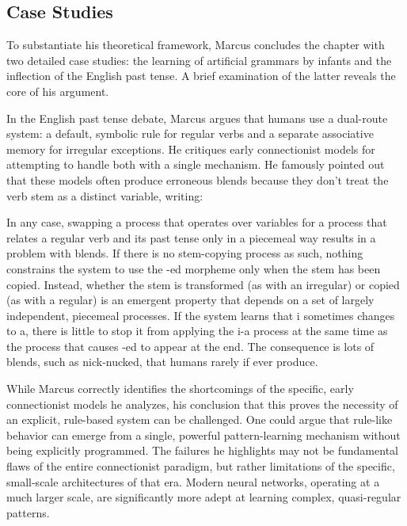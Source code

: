 \documentclass[../../main.tex]{subfiles}
\begin{document}

\subsection{Case Studies}
To substantiate his theoretical framework, Marcus concludes the chapter with two detailed case studies: the learning of artificial grammars by infants and the inflection of the English past tense. A brief examination of the latter reveals the core of his argument.

In the English past tense debate, Marcus argues that humans use a dual-route system: a default, symbolic rule for regular verbs and a separate associative memory for irregular exceptions. He critiques early connectionist models for attempting to handle both with a single mechanism. He famously pointed out that these models often produce erroneous blends because they don't treat the verb stem as a distinct variable, writing:

\begin{citecallout}
    In any case, swapping a process that operates over variables for a process that relates a regular verb and its past tense only in a piecemeal way
    results in a problem with blends. If there is no stem-copying process as
    such, nothing constrains the system to use the -ed morpheme only when
    the stem has been copied. Instead, whether the stem is transformed (as
    with an irregular) or copied (as with a regular) is an emergent property
    that depends on a set of largely independent, piecemeal processes. If the
    system learns that i sometimes changes to a, there is little to stop it from
    applying the i-a process at the same time as the process that causes -ed to
    appear at the end. The consequence is lots of blends, such as nick-nucked,
    that humans rarely if ever produce.
\end{citecallout}

\begin{critique}
    While Marcus correctly identifies the shortcomings of the specific, early connectionist models he analyzes, his conclusion that this proves the necessity of an explicit, rule-based system can be challenged. One could argue that rule-like behavior can emerge from a single, powerful pattern-learning mechanism without being explicitly programmed. The failures he highlights may not be fundamental flaws of the entire connectionist paradigm, but rather limitations of the specific, small-scale architectures of that era. Modern neural networks, operating at a much larger scale, are significantly more adept at learning complex, quasi-regular patterns.
\end{critique}
\end{document}

